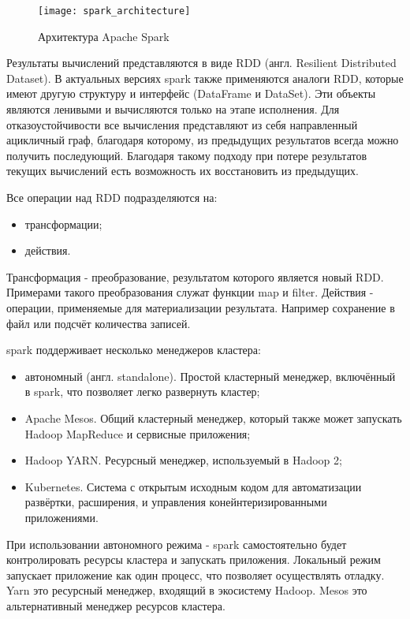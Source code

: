 \begin{figure}
    \centering
    \texttt{[image: spark\_architecture]}
    \caption{Архитектура Apache Spark}
    \label{pic:lit_review:spark_architecture}
\end{figure}

Результаты вычислений представляются в виде RDD (англ. Resilient Distributed Dataset). 
В актуальных версиях spark также применяются аналоги RDD, которые имеют другую структуру и интерфейс (DataFrame и DataSet).
Эти объекты являются ленивыми и вычисляются только на этапе исполнения.
Для отказоустойчивости все вычисления представляют из себя направленный ацикличный граф, благодаря которому, из предыдущих результатов всегда можно получить последующий.
Благодаря такому подходу при потере результатов текущих вычислений есть возможность их восстановить из предыдущих.

Все операции над RDD подразделяются на:
\begin{itemize}
    \item трансформации;
    \item действия.
\end{itemize}

Трансформация - преобразование, результатом которого является новый RDD. 
Примерами такого преобразования служат функции map и filter.
Действия - операции, применяемые для материализации результата.
Например сохранение в файл или подсчёт количества записей.

spark поддерживает несколько менеджеров кластера:
\begin{itemize}
    \item автономный (англ. standalone). Простой кластерный менеджер, включённый в spark, что позволяет легко развернуть кластер;
    \item Apache Mesos. Общий кластерный менеджер, который также может запускать Hadoop MapReduce и сервисные приложения;
    \item Hadoop YARN. Ресурсный менеджер, используемый в Hadoop 2;
    \item Kubernetes. Система с открытым исходным кодом для автоматизации развёртки, расширения, и управления конейнтеризированными приложениями.
\end{itemize}

При использовании автономного режима - spark самостоятельно будет контролировать ресурсы кластера и запускать приложения.
Локальный режим запускает приложение как один процесс, что позволяет осуществлять отладку.
Yarn это ресурсный менеджер, входящий в экосистему Hadoop.
Mesos это альтернативный менеджер ресурсов кластера.
    
